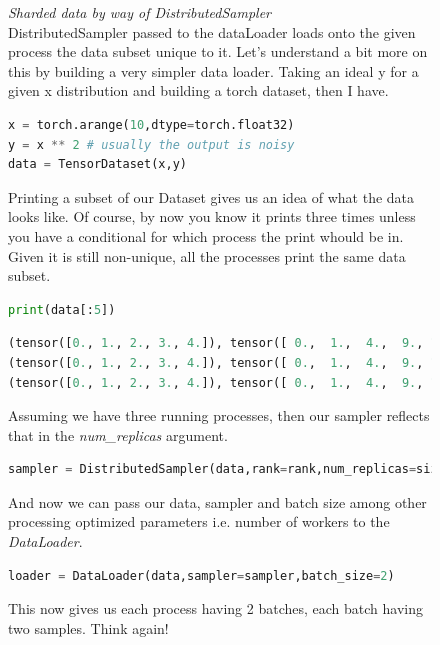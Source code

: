 \documentclass[12pt]{article}
\newcommand{\customtext}[3]{%
    \vspace{#2} %
    \fontsize{13}{8}\textcolor{#1}{\textit{#3}}%
}
\begin{document}
\pagebreak
\begin{figure}[!htb]
    \begin{minipage}[t]{0.65\textwidth}
    \customtext{xtitle}{0em}{Sharded data by way of DistributedSampler}\\
        DistributedSampler passed to the dataLoader loads onto the given process the data subset 
        unique to it. Let's understand a bit more on this by building a very simpler data loader.
        Taking an ideal y for a given x distribution and building a torch dataset, then I have.
\begin{lstlisting}[language=python,style=python,basicstyle=\ttfamily\footnotesize]
x = torch.arange(10,dtype=torch.float32)
y = x ** 2 # usually the output is noisy
data = TensorDataset(x,y)
\end{lstlisting}
Printing a subset of our Dataset gives us an idea of what the data looks like. Of course, 
by now you know it prints three times unless you have a conditional for which process the 
print whould be in. Given it is still non-unique, all the processes print the same data subset. 
\begin{lstlisting}[language=python,style=python,basicstyle=\ttfamily\footnotesize]
print(data[:5])
\end{lstlisting}
\begin{lstlisting}[language=python,style=python,basicstyle=\ttfamily\scriptsize]
(tensor([0., 1., 2., 3., 4.]), tensor([ 0.,  1.,  4.,  9., 16.]))
(tensor([0., 1., 2., 3., 4.]), tensor([ 0.,  1.,  4.,  9., 16.]))
(tensor([0., 1., 2., 3., 4.]), tensor([ 0.,  1.,  4.,  9., 16.]))
\end{lstlisting}
Assuming we have three running processes, then our sampler reflects that in the 
{\it\color{Maroon}num\_replicas} argument.
\begin{lstlisting}[language=python,style=python,basicstyle=\ttfamily\footnotesize]
sampler = DistributedSampler(data,rank=rank,num_replicas=size)
\end{lstlisting}
And now we can pass our data, sampler and batch size among other processing optimized 
parameters i.e. number of workers to the {\it\color{xlink}DataLoader}.
\begin{lstlisting}[language=python,style=python,basicstyle=\ttfamily\footnotesize]
loader = DataLoader(data,sampler=sampler,batch_size=2)
\end{lstlisting}
This now gives us each process having 2 batches, each batch having two samples. Think again!

\end{minipage}
\end{figure}
\end{document}
